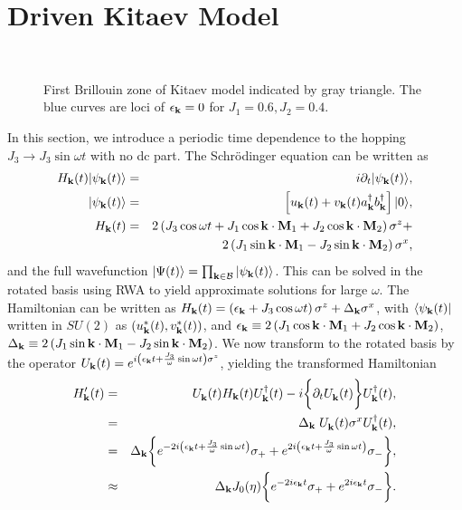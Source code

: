 \documentclass[a4paper,10pt]{article}
\begin{document}
\section{\sc Driven Kitaev Model}
\begin{figure*}[hbt]
\ 
\caption{First Brillouin zone of Kitaev model indicated by gray triangle. The blue curves are loci of $\epsilon_{\bf k}=0$ for $J_1=0.6, J_2=0.4$.}  
\label{kitaev:fbz}
\end{figure*}
In this section, we introduce a periodic time dependence to the hopping $J_3 \rightarrow J_3 \sin{\omega t}$ with no dc part. The Schr\"odinger equation can be written as
\begin{eqnarray}
H_{\bf k}(t)|\psi_{\bf k}(t)\rangle &=& i \partial_t |\psi_{\bf k}(t)\rangle ,\nonumber \\
|\psi_{\bf k}(t)\rangle &=& \left[u_{\bf k}(t) + v_{\bf k}(t)a^\dagger_{\bf k}b^\dagger_{\bf k}\right]|0\rangle, \nonumber \\
H_{{\bf k}}(t) &=& 2\left(J_3 \cos{\omega t}+ J_1 \cos{{\bf k}\cdot{\bf M}_1} + J_2 \cos{{\bf k}\cdot{\bf M}_2}\right)\sigma^z +\nonumber \\
	       & & 2\left(J_1 \sin{{\bf k}\cdot{\bf M}_1} - J_2 \sin{{\bf k}\cdot{\bf M}_2}\right)\sigma^x,
\end{eqnarray}
and the full wavefunction $|\Psi(t)\rangle = \prod_{{\bf k}\in\mathcal{B}}|\psi_{\bf k}(t)\rangle$. This can be solved in the rotated basis using RWA to yield approximate solutions for large $\omega$. The Hamiltonian can be written as
$H_{\bf k}(t) = \left(\epsilon_{\bf k}+J_3\cos{\omega t}\right) \sigma^z + \Delta_{\bf k} \sigma^x$, with $\langle\psi_{\bf k}(t)|$ written in $SU(2)$ as $\left(u^\ast_{\bf k}(t), v^\ast_{\bf k}(t)\right)$, and $\epsilon_{\bf k}\equiv 2\left(J_1 \cos{{\bf k}\cdot{\bf M}_1} + J_2 \cos{{\bf k}\cdot{\bf M}_2}\right)$, $\Delta_{\bf k}\equiv2\left(J_1 \sin{{\bf k}\cdot{\bf M}_1} - J_2 \sin{{\bf k}\cdot{\bf M}_2}\right)$. We now transform to the rotated basis by the operator $U_{\bf k}(t)=e^{i\left(\epsilon_{\bf k}t+\frac{J_3}{\omega}\sin{\omega t}\right)\sigma^z}$, yielding the transformed Hamiltonian
\begin{eqnarray}
\label{rwa}
H'_{\bf k}(t) &=& U^{\;}_{\bf k}(t)H_{\bf k}(t)U^\dagger_{\bf k}(t)-i \bigg\{\partial_t U^{\;}_{\bf k}(t)\bigg\}U^{\dagger}_{\bf k}(t) ,\nonumber \\
	      &=& \Delta_{\bf k}\; U^{\;}_{\bf k}(t) \sigma^x U^{\dagger}_{\bf k}(t),\nonumber \\
	      &=& \Delta_{\bf k}\bigg\{e^{-2i\left(\epsilon_{\bf k}t+\frac{J_3}{\omega}\sin{\omega t}\right)}\sigma_+ + e^{2i\left(\epsilon_{\bf k}t+\frac{J_3}{\omega}\sin{\omega t}\right)}\sigma_-\bigg\},\nonumber \\
	      &\approx& \Delta_{\bf k} J_0(\eta) \bigg\{e^{-2i\epsilon_{\bf k}t}\sigma_+ + e^{2i\epsilon_{\bf k}t}\sigma_-\bigg\}.
\end{eqnarray}
\end{document}
